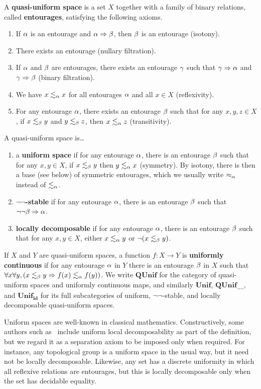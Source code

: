 \documentclass{article}
\def\leapx{\lesssim}
\def\ent#1{\leapx_{#1}}
\let\implies\Rightarrow
\def\nn{\ensuremath{\neg\neg}}
\def\QUnif{\mathbf{QUnif}}
\def\Unif{\mathbf{Unif}}
\def\QUnifnn{\mathbf{QUnif}_{\nn}}
\def\ldUnif{\mathbf{Unif}_{\mathbf{ld}}}
\begin{document}
\begin{defn}
  A \textbf{quasi-uniform space} is a set $X$ together with a family of binary relations, called \textbf{entourages}, satisfying the following axioms.
  \begin{enumerate}
  \item If $\alpha$ is an entourage and $\al\implies\be$, then $\beta$ is an entourage (isotony).
  \item There exists an entourage (nullary filtration).
  \item If $\alpha$ and $\beta$ are entourages, there exists an entourage $\gamma$ such that $\gm\implies\al$ and $\gm\implies\be$ (binary filtration).
  \item We have $x\ent\al x$ for all entourages $\alpha$ and all $x\in X$ (reflexivity).
  \item For any entourage $\alpha$, there exists an entourage $\beta$ such that for any $x,y,z\in X$, if $x\ent\be y$ and $y\ent\be z$, then $x\ent\al z$ (transitivity).
  \end{enumerate}
  A quasi-uniform space is\dots
  \begin{enumerate}[resume]
  \item a \textbf{uniform space} if for any entourage $\alpha$, there is an entourage $\beta$ such that for any $x,y\in X$, if $x\ent\be y$ then $y\ent\al x$ (symmetry).
    By isotony, there is then a base (see below) of symmetric entourages, which we usually write $\approx_\alpha$ instead of $\ent\al$.
  \item \textbf{\nn-stable} if for any entourage $\alpha$, there is an entourage $\beta$ such that $\neg\neg\be\implies \al$.
  \item \textbf{locally decomposable} if for any entourage $\alpha$, there is an entourage $\beta$ such that for any $x,y\in X$, either $x\ent\al y$ or $\neg(x\ent\be y)$.
  \end{enumerate}
  If $X$ and $Y$ are quasi-uniform spaces, a function $f:X\to Y$ is \textbf{uniformly continuous} if for any entourage $\alpha$ in $Y$ there is an entourage $\beta$ in $X$ such that $\forall x\forall y, (x\ent\be y \implies f(x)\ent\al f(y))$.
  We write $\QUnif$ for the category of quasi-uniform spaces and uniformly continuous maps, and similarly
  $\Unif$, $\QUnifnn$, and $\ldUnif$ for its full subcategories of uniform, \nn-stable,
  and locally decomposable quasi-uniform spaces.
\end{defn}

Uniform spaces are well-known in classical mathematics.
Constructively, some authors such as~\cite{bridges-vita} include uniform local decomposability as part of the definition, but we regard it as a separation axiom to be imposed only when required.
For instance, any topological group is a uniform space in the usual way, but it need not be locally decomposable.
Likewise, any set has a discrete uniformity in which all reflexive relations are entourages, but this is locally decomposable only when the set has decidable equality.
\end{document}
